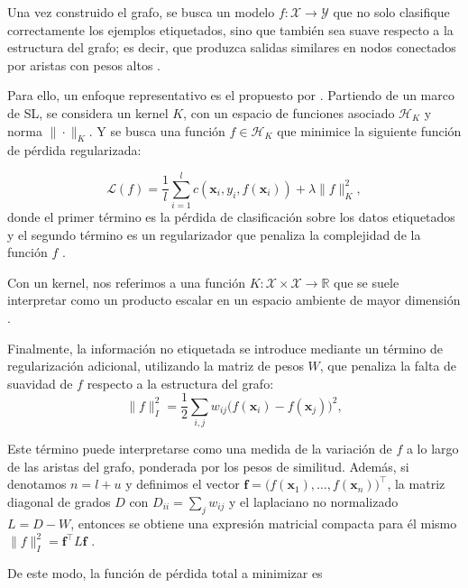 Una vez construido el grafo, se busca un modelo $f:\mathcal{X}\to\mathcal{Y}$ que no solo clasifique correctamente los ejemplos etiquetados, sino que también sea suave respecto a la estructura del grafo; es decir, que produzca salidas similares en nodos conectados por aristas con pesos altos \cite{zhu2009introduction}.

Para ello, un enfoque representativo es el propuesto por \citet{belkin2005manifold}. Partiendo de un marco de \gls{SL}, se considera un kernel $K$, con un espacio de funciones asociado $\mathcal{H}_K$ y norma $\|\cdot\|_K$. Y se busca una función $f\in\mathcal{H}_K$ que minimice la siguiente función de pérdida regularizada:

\begin{equation}
    \mathcal{L}(f) = \frac{1}{l} \sum_{i=1}^l c(\mathbf{x}_i,y_i,f(\mathbf{x}_i)) + \lambda \|f\|_K^2,
\end{equation}
donde el primer término es la pérdida de clasificación sobre los datos etiquetados y el segundo término es un regularizador que penaliza la complejidad de la función $f$ \cite{belkin2005manifold}.

\begin{rema}
   Con un kernel, nos referimos a una función $K:\mathcal{X}\times\mathcal{X}\to\mathbb{R}$ que se suele interpretar como un producto escalar en un espacio ambiente de mayor dimensión \cite{bishop2006pattern}.
\end{rema}

Finalmente, la información no etiquetada se introduce mediante un término de regularización adicional, utilizando la matriz de pesos $W$, que penaliza la falta de suavidad de $f$ respecto a la estructura del grafo:
\begin{equation}
    \|f\|_I^2 = \frac{1}{2} \sum_{i,j} w_{ij} \bigl(f(\mathbf{x}_i) - f(\mathbf{x}_j)\bigr)^2,
\end{equation}

Este término puede interpretarse como una medida de la variación de $f$ a lo largo de las aristas del grafo, ponderada por los pesos de similitud. Además, si denotamos $n=l+u$ y definimos el vector $\mathbf{f} = \bigl(f(\mathbf{x}_1),\dots,f(\mathbf{x}_n)\bigr)^{\top}$, la matriz diagonal de grados $D$ con $D_{ii}=\sum_j w_{ij}$ y el laplaciano no normalizado $L=D-W$, entonces se obtiene una expresión matricial compacta para él mismo $\|f\|_I^2 = \mathbf{f}^{\top} L \mathbf{f}$ \cite{belkin2005manifold}.

De este modo, la función de pérdida total a minimizar es


